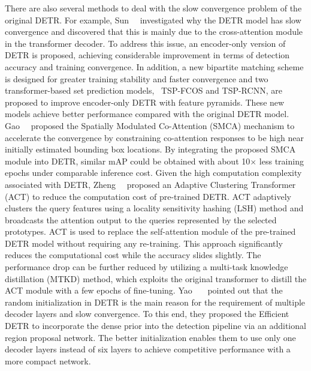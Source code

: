 There are also several methods to deal with the slow convergence problem of the original DETR. For example, Sun~\etal~ investigated why the DETR model has slow convergence and discovered that this is mainly due to the cross-attention module in the transformer decoder. To address this issue, an encoder-only version of DETR is proposed, achieving considerable improvement in terms of detection accuracy and training convergence. In addition, a new bipartite matching scheme is designed for greater training stability and faster convergence and two transformer-based set prediction models, \ie~TSP-FCOS and TSP-RCNN, are proposed to improve encoder-only DETR with feature pyramids. These new models achieve better performance compared with the original DETR model. Gao~\etal~ proposed the Spatially Modulated Co-Attention (SMCA) mechanism to accelerate the convergence by constraining co-attention responses to be high near initially estimated bounding box locations. By integrating the proposed SMCA module into DETR, similar mAP could be obtained with about 10$\times$ less training epochs under comparable inference cost.
Given the high computation complexity associated with DETR, Zheng~\etal~ proposed an Adaptive Clustering Transformer (ACT) to reduce the computation cost of pre-trained DETR. ACT adaptively clusters the query features using a locality sensitivity hashing (LSH) method and broadcasts the attention output to the queries represented by the selected prototypes. ACT is used to replace the self-attention module of the pre-trained DETR model without requiring any re-training. This approach significantly reduces the computational cost while the accuracy slides slightly. The performance drop can be further reduced by utilizing a multi-task knowledge distillation (MTKD) method, which exploits the original transformer to distill the ACT module with a few epochs of fine-tuning. Yao~\etal~~ pointed out that the random initialization in DETR is the main reason for the requirement of multiple decoder layers and slow convergence. To this end, they proposed the Efficient DETR to incorporate the dense prior into the detection pipeline via an additional region proposal network. The better initialization enables them to use only one decoder layers instead of six layers to achieve competitive performance with a more compact network.

